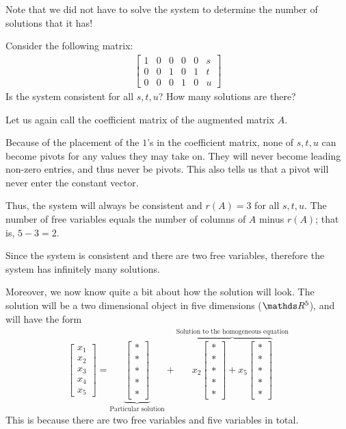 \documentclass[11pt]{article}
\begin{document}
Note that we did not have to solve the system to determine the number of solutions that it has!



Consider the following matrix:
\begin{align*}
\left[
\begin{matrix}
1 & 0 & 0 & 0 & 0 & s
\\
0 & 0 & 1 & 0 & 1 & t
\\
0 & 0 & 0 & 1 & 0 & u
\end{matrix}
\right]
\end{align*}
Is the system consistent for all $s,t,u$? How many solutions are there?

Let us again call the coefficient matrix of the augmented matrix $A$.

Because of the placement of the $1$'s in the coefficient matrix, none of $s,t,u$ can become pivots for any values they may take on. They will never become leading non-zero entries, and thus never be pivots. This also tells us that a pivot will never enter the constant vector.

Thus, the system will always be consistent and $r(A) = 3$ for all $s,t,u$. The number of free variables equals the number of columns of $A$ minus $r(A)$; that is, $5-3 = 2$.

Since the system is consistent and there are two free variables, therefore the system has infinitely many solutions.

Moreover, we now know quite a bit about how the solution will look. The solution will be a two dimensional object in five dimensions ($\bbR^5$), and will have the form
\begin{align*}
\begin{bmatrix}
x_1
\\
x_2
\\
x_3
\\
x_4
\\
x_5
\end{bmatrix}
=
\underbrace{\begin{bmatrix} * \\ * \\ * \\ * \\ * \end{bmatrix}}_{\text{Particular solution}}
+
\overbrace{x_2 \begin{bmatrix} * \\ * \\ * \\ * \\ * \end{bmatrix}
+
x_5 \begin{bmatrix} * \\ * \\ * \\ * \\ * \end{bmatrix}
}^{\text{Solution to the homogeneous equation}}
\end{align*}
This is because there are two free variables and five variables in total.
\end{document}
